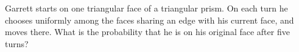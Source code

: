 Garrett starts on one triangular face of a triangular prism. On each turn he chooses uniformly among the faces sharing an edge with his current face, and moves there. What is the probability that he is on his original face after five turns?
